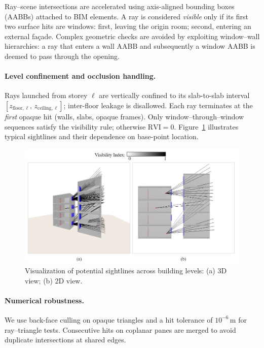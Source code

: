 \documentclass[final,3p,times,review]{elsarticle}
\begin{document}
Ray–scene intersections are accelerated using axis-aligned bounding boxes (AABBs) attached to BIM elements. A ray is considered \emph{visible} only if its first two surface hits are windows: first, leaving the origin room; second, entering an external façade. Complex geometric checks are avoided by exploiting window–wall hierarchies: a ray that enters a wall AABB and subsequently a window AABB is deemed to pass through the opening.

\paragraph{Level confinement and occlusion handling.}
Rays launched from storey $\ell$ are vertically confined to its slab-to-slab interval $[z_{\mathrm{floor},\ell},\,z_{\mathrm{ceiling},\ell}]$; inter-floor leakage is disallowed. Each ray terminates at the \emph{first} opaque hit (walls, slabs, opaque frames). Only window–through–window sequences satisfy the visibility rule; otherwise $\mathrm{RVI}=0$. Figure~\ref{fig:ray-intersections} illustrates typical sightlines and their dependence on base-point location.

\begin{figure}[H]
    \centering
    \includegraphics[width=1\textwidth]{ray-intersections.jpg}
    \caption{Visualization of potential sightlines across building levels: (a) 3D view; (b) 2D view.}
    \label{fig:ray-intersections}
\end{figure}

\paragraph{Numerical robustness.}
We use back-face culling on opaque triangles and a hit tolerance of $10^{-6}$\,m for ray–triangle tests. Consecutive hits on coplanar panes are merged to avoid duplicate intersections at shared edges.
\end{document}
